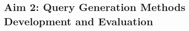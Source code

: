 \documentclass[../main.tex]{subfiles}
\begin{document}
\subsection{Aim 2: Query Generation Methods Development and Evaluation}

\subsubsection{}

\subsubsection{}
\end{document}
